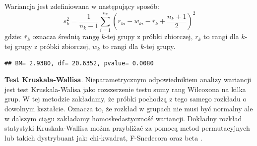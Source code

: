 \documentclass[polish,]{book}
\newenvironment{Shaded}{\begin{snugshade}}{\end{snugshade}}
\newcommand{\BuiltInTok}[1]{#1}
\newcommand{\DecValTok}[1]{\textcolor[rgb]{0.00,0.00,0.81}{#1}}
\newcommand{\FloatTok}[1]{\textcolor[rgb]{0.00,0.00,0.81}{#1}}
\newcommand{\ImportTok}[1]{#1}
\newcommand{\NormalTok}[1]{#1}
\newcommand{\OperatorTok}[1]{\textcolor[rgb]{0.81,0.36,0.00}{\textbf{#1}}}
\newcommand{\SpecialCharTok}[1]{\textcolor[rgb]{0.00,0.00,0.00}{#1}}
\newcommand{\StringTok}[1]{\textcolor[rgb]{0.31,0.60,0.02}{#1}}
\begin{document}
Wariancja jest zdefiniowana w następujący sposób:
\begin{equation}
s_k^2=\frac{1}{n_k-1}\sum_{i=1}^{n_k}\left(r_{ki}-w_{ki}-\bar{r}_k+\frac{n_k+1}{2}\right)^2
\label{eq:mw09}
\end{equation}
gdzie: \(\bar{r}_k\) oznacza średnią rangę \(k\)-tej grupy z próbki zbiorczej, \(r_k\) to rangi dla \(k\)-tej grupy z próbki zbiorczej, \(w_k\) to rangi dla \(k\)-tej grupy.

\begin{Shaded}
\end{Shaded}

\begin{verbatim}
## BM= 2.9380, df= 20.6352, pvalue= 0.0080
\end{verbatim}

\textbf{Test Kruskala-Wallisa}. Nieparametrycznym odpowiednikiem analizy wariancji jest test Kruskala-Walisa jako rozszerzenie testu sumy rang Wilcoxona na kilka grup. W tej metodzie zakładamy, że próbki pochodzą z tego samego rozkładu o dowolnym kształcie. Oznacza to, że rozkład w grupach nie musi być normalny ale w dalszym ciągu zakładamy homoskedastyczność wariancji.
Dokładny rozkład statystyki Kruskala-Wallisa można przybliżać za pomocą metod permutacyjnych lub takich dystrybuant jak: chi-kwadrat, F-Snedecora oraz beta \citep{kw2013}.
\end{document}
